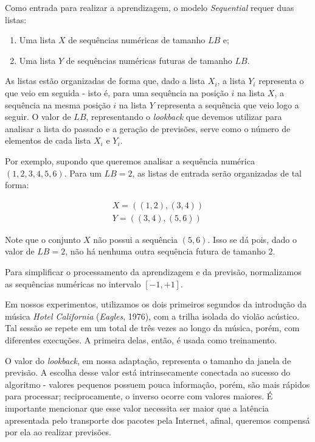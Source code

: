 Como entrada para realizar a aprendizagem, o modelo \textit{Sequential} requer duas listas:

\begin{enumerate}
    \item Uma lista $X$ de sequências numéricas de tamanho $LB$ e;
    \item Uma lista $Y$ de sequências numéricas futuras de tamanho $LB$.
\end{enumerate}

As listas estão organizadas de forma que, dado a lista $X_i$, a lista $Y_i$ representa o que veio em seguida - isto é, para uma sequência na posição $i$ na lista $X$, a sequência na mesma posição $i$ na lista $Y$ representa a sequência que veio logo a seguir. O valor de $LB$, representando o \textit{lookback} que devemos utilizar para analisar a lista do passado e a geração de previsões, serve como o número de elementos de cada lista $X_i$ e $Y_i$.

Por exemplo, supondo que queremos analisar a sequência numérica $(1, 2, 3, 4, 5, 6)$. Para um $LB = 2$, as listas de entrada serão organizadas de tal forma:

\begin{equation}
\begin{split}
    X = ((1, 2), (3, 4)) \\
    Y = ((3, 4), (5, 6))
\end{split}
\end{equation}

Note que o conjunto $X$ não possui a sequência $(5,6)$. Isso se dá pois, dado o valor de $LB = 2$, não há nenhuma outra sequência futura de tamanho $2$.

Para simplificar o processamento da aprendizagem e da previsão, normalizamos as sequências numéricas no intervalo $[-1, +1]$.

Em nossos experimentos, utilizamos os dois primeiros segundos da introdução da música \textit{Hotel California} (\textit{Eagles}, 1976), com a trilha isolada do violão acústico. Tal sessão se repete em um total de três vezes ao longo da música, porém, com diferentes execuções. A primeira delas, então, é usada como treinamento.

O valor do \textit{lookback}, em nossa adaptação, representa o tamanho da janela de previsão. A escolha desse valor está intrinsecamente conectada ao sucesso do algoritmo - valores pequenos possuem pouca informação, porém, são mais rápidos para processar; reciprocamente, o inverso ocorre com valores maiores. É importante mencionar que esse valor necessita ser maior que a latência apresentada pelo transporte dos pacotes pela Internet, afinal, queremos compensá por ela ao realizar previsões.

